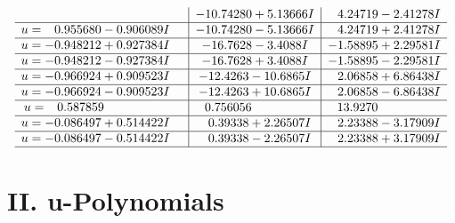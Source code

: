 \documentclass[1p]{elsarticle_modified}
\theoremstyle{definition}
\begin{document}
$$\begin{array}{c|c|c}
 & -10.74280 + 5.13666 I & \phantom{-}4.24719 - 2.41278 I \\ \hline\begin{aligned}
u &= \phantom{-}0.955680 - 0.906089 I\end{aligned}
 & -10.74280 - 5.13666 I & \phantom{-}4.24719 + 2.41278 I \\ \hline\begin{aligned}
u &= -0.948212 + 0.927384 I\end{aligned}
 & -16.7628 - 3.4088 I & -1.58895 + 2.29581 I \\ \hline\begin{aligned}
u &= -0.948212 - 0.927384 I\end{aligned}
 & -16.7628 + 3.4088 I & -1.58895 - 2.29581 I \\ \hline\begin{aligned}
u &= -0.966924 + 0.909523 I\end{aligned}
 & -12.4263 - 10.6865 I & \phantom{-}2.06858 + 6.86438 I \\ \hline\begin{aligned}
u &= -0.966924 - 0.909523 I\end{aligned}
 & -12.4263 + 10.6865 I & \phantom{-}2.06858 - 6.86438 I \\ \hline\begin{aligned}
u &= \phantom{-}0.587859\phantom{ +0.000000I}\end{aligned}
 & \phantom{-}0.756056\phantom{ +0.000000I} & \phantom{-}13.9270\phantom{ +0.000000I} \\ \hline\begin{aligned}
u &= -0.086497 + 0.514422 I\end{aligned}
 & \phantom{-}0.39338 + 2.26507 I & \phantom{-}2.23388 - 3.17909 I \\ \hline\begin{aligned}
u &= -0.086497 - 0.514422 I\end{aligned}
 & \phantom{-}0.39338 - 2.26507 I & \phantom{-}2.23388 + 3.17909 I\\
 \hline 
 \end{array}$$\newpage
\newpage\renewcommand{\arraystretch}{1}
\centering \section*{ II. u-Polynomials}
\end{document}
